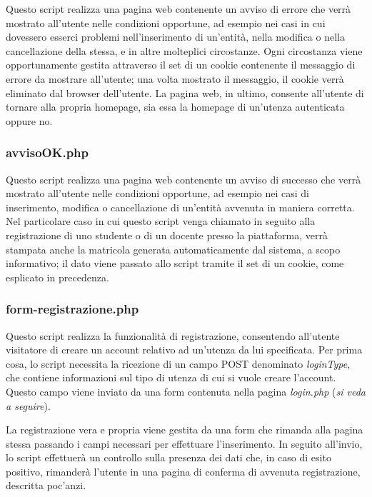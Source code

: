 \documentclass [a4paper,11pt]{book}
\begin{document}
Questo script realizza una pagina web contenente un avviso di errore che verrà mostrato all'utente nelle condizioni opportune, ad esempio nei casi in cui dovessero esserci problemi nell'inserimento di un'entità, nella modifica o nella cancellazione della stessa, e in altre molteplici circostanze. Ogni circostanza viene opportunamente gestita attraverso il set di un cookie contenente il messaggio di errore da mostrare all'utente; una volta mostrato il messaggio, il cookie verrà eliminato dal browser dell'utente. La pagina web, in ultimo, consente all'utente di tornare alla propria homepage, sia essa la homepage di un'utenza autenticata oppure no.

\medskip

\subsubsection{avvisoOK.php}

Questo script realizza una pagina web contenente un avviso di successo che verrà mostrato all'utente nelle condizioni opportune, ad esempio nei casi di inserimento, modifica o cancellazione di un'entità avvenuta in maniera corretta. Nel particolare caso in cui questo script venga chiamato in seguito alla registrazione di uno studente o di un docente presso la piattaforma, verrà stampata anche la matricola generata automaticamente dal sistema, a scopo informativo; il dato viene passato allo script tramite il set di un cookie, come esplicato in precedenza.

\medskip

\subsubsection{form-registrazione.php}

Questo script realizza la funzionalità di registrazione, consentendo all'utente visitatore di creare un account relativo ad un'utenza da lui specificata. Per prima cosa, lo script necessita la ricezione di un campo POST denominato \emph{loginType}, che contiene informazioni sul tipo di utenza di cui si vuole creare l'account. Questo campo viene inviato da una form contenuta nella pagina \emph{login.php} (\emph{si veda a seguire}).

\medskip

La registrazione vera e propria viene gestita da una form che rimanda alla pagina stessa passando i campi necessari per effettuare l'inserimento. In seguito all'invio, lo script effettuerà un controllo sulla presenza dei dati che, in caso di esito positivo, rimanderà l'utente in una pagina di conferma di avvenuta registrazione, descritta poc'anzi.
\end{document}
